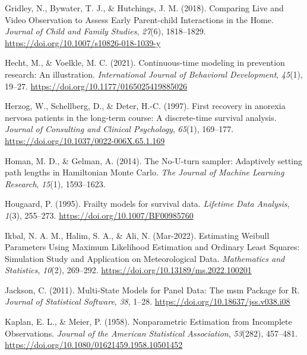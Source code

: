 \documentclass[12pt]{./styles/outhesis}
\begin{document}
\leavevmode{}%
Gridley, N., Bywater, T. J., \& Hutchings, J. M. (2018). Comparing
{Live} and {Video Observation} to {Assess Early Parent-child
Interactions} in the {Home}. \emph{Journal of Child and Family Studies},
\emph{27}(6), 1818--1829.
\url{https://doi.org/10.1007/s10826-018-1039-y}

\leavevmode{}%
Hecht, M., \& Voelkle, M. C. (2021). Continuous-time modeling in
prevention research: {An} illustration. \emph{International Journal of
Behavioral Development}, \emph{45}(1), 19--27.
\url{https://doi.org/10.1177/0165025419885026}

\leavevmode{}%
Herzog, W., Schellberg, D., \& Deter, H.-C. (1997). First recovery in
anorexia nervosa patients in the long-term course: {A} discrete-time
survival analysis. \emph{Journal of Consulting and Clinical Psychology},
\emph{65}(1), 169--177. \url{https://doi.org/10.1037/0022-006X.65.1.169}

\leavevmode{}%
Homan, M. D., \& Gelman, A. (2014). The {No-U-turn} sampler: Adaptively
setting path lengths in {Hamiltonian Monte Carlo}. \emph{The Journal of
Machine Learning Research}, \emph{15}(1), 1593--1623.

\leavevmode{}%
Hougaard, P. (1995). Frailty models for survival data. \emph{Lifetime
Data Analysis}, \emph{1}(3), 255--273.
\url{https://doi.org/10.1007/BF00985760}

\leavevmode{}%
Ikbal, N. A. M., Halim, S. A., \& Ali, N. (Mar-2022). Estimating
{Weibull Parameters Using Maximum Likelihood Estimation} and {Ordinary
Least Squares}: {Simulation Study} and {Application} on {Meteorological
Data}. \emph{Mathematics and Statistics}, \emph{10}(2), 269--292.
\url{https://doi.org/10.13189/ms.2022.100201}

\leavevmode{}%
Jackson, C. (2011). Multi-{State Models} for {Panel Data}: {The} msm
{Package} for {R}. \emph{Journal of Statistical Software}, \emph{38},
1--28. \url{https://doi.org/10.18637/jss.v038.i08}

\leavevmode{}%
Kaplan, E. L., \& Meier, P. (1958). Nonparametric {Estimation} from
{Incomplete Observations}. \emph{Journal of the American Statistical
Association}, \emph{53}(282), 457--481.
\url{https://doi.org/10.1080/01621459.1958.10501452}
\end{document}
